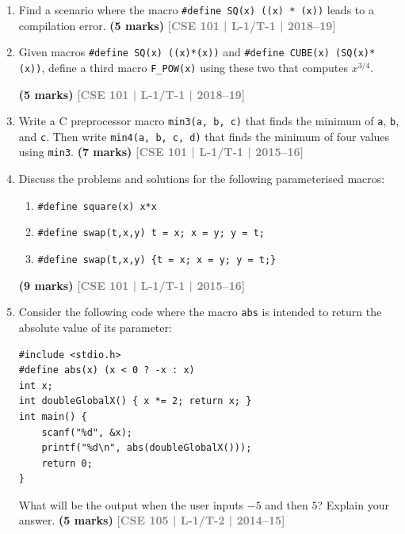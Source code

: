 \documentclass[12pt,a3paper]{article}
\newcommand{\yr}[1]{\hfill\textcolor{gray}{\small\textbf{[#1]}}}
\newcommand{\mk}[1]{\textcolor{orange!70!black}{\small\textbf{(#1 marks)}}}
\begin{document}
\begin{enumerate}
\begin{lstlisting}[language=C, basicstyle=\ttfamily, frame=none]
#define SQ(x) ((x)*(x))
#define CUB(x) (SQ(x)*(x))
\end{lstlisting}

\vspace{0.5em}
\noindent
Define a third macro \textit{F\_POW(x)} using the above two macros in your definition that will produce:

\[
\frac{x^3}{x^8}
\]\mk{5} \yr{CSE 101 | L-1/T-1 | 2020--21}

\item Find a scenario where the macro \texttt{\#define SQ(x) ((x) * (x))} leads to a compilation error.
\mk{5} \yr{CSE 101 | L-1/T-1 | 2018--19}

\item Given macros \texttt{\#define SQ(x) ((x)*(x))} and \texttt{\#define CUBE(x) (SQ(x)*(x))}, define a third macro \texttt{F\_POW(x)} using these two that computes $x^{3/4}$.
 
\mk{5} \yr{CSE 101 | L-1/T-1 | 2018--19}

\item Write a C preprocessor macro \texttt{min3(a, b, c)} that finds the minimum of \texttt{a}, \texttt{b}, and \texttt{c}. Then write \texttt{min4(a, b, c, d)} that finds the minimum of four values using \texttt{min3}.
\mk{7} \yr{CSE 101 | L-1/T-1 | 2015--16}

\item Discuss the problems and solutions for the following parameterised macros:
\begin{enumerate}
  \item \texttt{\#define square(x) x*x}
  \item \texttt{\#define swap(t,x,y) t = x; x = y; y = t;}
  \item \texttt{\#define swap(t,x,y) \{t = x; x = y; y = t;\}}
\end{enumerate}
 
\mk{9} \yr{CSE 101 | L-1/T-1 | 2015--16}

\item Consider the following code where the macro \texttt{abs} is intended to return the absolute value of its parameter:
 
\begin{lstlisting}
#include <stdio.h>
#define abs(x) (x < 0 ? -x : x)
int x;
int doubleGlobalX() { x *= 2; return x; }
int main() {
    scanf("%d", &x);
    printf("%d\n", abs(doubleGlobalX()));
    return 0;
}
\end{lstlisting}
What will be the output when the user inputs $-5$ and then $5$? Explain your answer.
\mk{5} \yr{CSE 105 | L-1/T-2 | 2014--15}


\end{enumerate}
\end{document}
